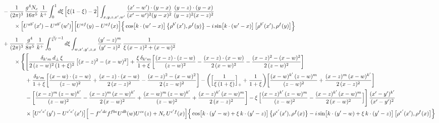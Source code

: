 \documentclass[10pt]{article}
\numberwithin{equation}{section}
\begin{document}
\begin{align}
&-\frac{1}{(2\pi)^{3}}\,\frac{g^{4}N_{c}}{16\pi^{5}}\,\frac{1}{k^{+}}\int_{0}^{1}d\xi\,\Big[\xi(1-\xi)-2\Big]\int_{x,y,z,x^{\prime},w^{\prime}}\frac{(x^{\prime}-w^{\prime})\cdot(y-x)}{(x^{\prime}-w^{\prime})^{2}(y-x)^{2}}\,\frac{(y-z)\cdot(y-x)}{(y-z)^{2}(x-z)^{2}}\notag\\&\qquad\times\Big[U^{ab^{\prime}}(x^{\prime})-U^{ab^{\prime}}(w^{\prime})\Big]\Big[U^{af}(y)-U^{af}(x)\Big]\Big\{\cos\!\big[k\cdot(w^{\prime}-x)\big]\,\big\{\rho^{b^{\prime}}(x^{\prime}),\rho^{f}(y)\big\}-i\sin\!\big[k\cdot(w^{\prime}-x)\big]\,\big[\rho^{b^{\prime}}(x^{\prime}),\rho^{f}(y)\big]\Big\}\notag\\[4pt]
&+\frac{1}{(2\pi)^{3}}\,\frac{g^{4}}{8\pi^{5}}\,\frac{1}{k^{+}}\int_{0}^{\frac{\vee}{k^{+}}-1}d\xi\int_{w,x^{\prime},y^{\prime},z,x}\frac{(y^{\prime}-z)^{m}}{(y^{\prime}-z)^{2}}\,\frac{1}{\xi\,(x-z)^{2}+(x-w)^{2}}\notag\\
&\qquad\times\Bigg\{\Bigg[\frac{\delta_{k^{\prime}m}\,d_{\perp}\,\xi}{2\,(z-w)^{2}\,(1+\xi)^{2}}\left[(x-z)^{2}-(x-w)^{2}\right]+\frac{\xi\,\delta_{k^{\prime}m}}{1+\xi}\bigg[\frac{(x-z)\cdot(z-w)}{(z-w)^{2}}-\frac{(x-z)\cdot(x-w)}{2\,(x-w)^{2}}-\frac{(x-z)^{2}-(x-w)^{2}}{2\,(z-w)^{2}}\bigg]\notag\\
&\qquad\qquad+\frac{\delta_{k^{\prime}m}}{1+\xi}\bigg[\frac{(x-w)\cdot(z-w)}{(z-w)^{2}}+\frac{(x-z)\cdot(x-w)}{2\,(x-z)^{2}}-\frac{(x-z)^{2}-(x-w)^{2}}{2\,(z-w)^{2}}\bigg]
-\bigg(\Big[\frac{1}{\xi\,(1+\xi)}\Big]_{+}+\frac{1}{1+\xi}\bigg)\bigg[\frac{(x-w)^{k^{\prime}}\,(z-w)^{m}}{(z-w)^{2}}+\frac{(x-z)^{m}\,(x-w)^{k^{\prime}}}{2\,(x-z)^{2}}\bigg]\notag\\
&\qquad\qquad-\bigg[\frac{(x-z)^{m}\,(z-w)^{k^{\prime}}}{(z-w)^{2}}-\frac{(x-z)^{m}\,(x-w)^{k^{\prime}}}{2\,(x-w)^{2}}+\frac{(x-w)^{m}\,(z-w)^{k^{\prime}}}{(z-w)^{2}}+\frac{(x-z)^{k^{\prime}}\,(x-w)^{m}}{2\,(x-z)^{2}}\bigg]
-\xi\,\Big[\frac{(x-z)^{k^{\prime}}\,(z-w)^{m}}{(z-w)^{2}}-\frac{(x-z)^{k^{\prime}}\,(x-w)^{m}}{2\,(x-w)^{2}}\Big]\Bigg]\,\frac{(x^{\prime}-y^{\prime})^{k^{\prime}}}{(x^{\prime}-y^{\prime})^{2}}\notag\\
&\qquad\qquad\times\big[U^{c^{\prime}e^{\prime}}(y^{\prime})-U^{c^{\prime}e^{\prime}}(x^{\prime})\big]\Big[-f^{c^{\prime}dc}f^{fbe}U^{db}(w)U^{ce}(z)+N_{c}\,U^{c^{\prime}f}(x)\Big]\Big\{\cos\!\big[k\cdot(y^{\prime}-w)+\xi\,k\cdot(y^{\prime}-z)\big]\,\big\{\rho^{e^{\prime}}(x^{\prime}),\rho^{f}(x)\big\}-i\sin\!\big[k\cdot(y^{\prime}-w)+\xi\,k\cdot(y^{\prime}-z)\big]\,\big[\rho^{e^{\prime}}(x^{\prime}),\rho^{f}(x)\big]\Big\}\notag\\

\end{align}
\end{document}
